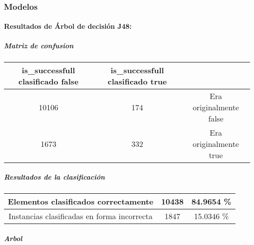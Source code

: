     \subsubsection{Modelos}

        \paragraph{Resultados de Árbol de decisión J48:}
            \subparagraph{Matriz de confusion}

                \begin{center}
                  \begin{tabular}{||c | c | c||}
                    \hline
                    is\_successfull clasificado false & is\_successfull clasificado true & \\ [0.5ex]
                    \hline
                    10106 & 174 & Era originalmente false \\
                    \hline
                    1673 & 332 & Era originalmente true \\
                    \hline
                  \end{tabular}
                \end{center}

            \subparagraph{Resultados de la clasificación}

                \begin{center}
                  \begin{tabular}{||c | c | c||}
                    \hline
                    Elementos clasificados correctamente & 10438 & 84.9654 \% \\ [0.5ex]
                    \hline
                    Instancias clasificadas en forma incorrecta & 1847 & 15.0346 \% \\
                    \hline
                  \end{tabular}
                \end{center}

            \newpage
            \subparagraph{Arbol}

                \begin{figure}[ht]
                \end{figure}
            \FloatBarrier
            \newpage

